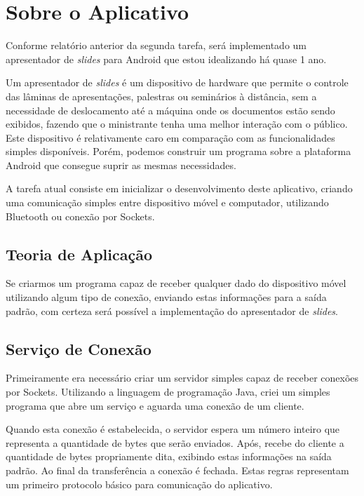 \documentclass{article}
\begin{document}
\section{Sobre o Aplicativo}
\label{sec:sobre}

Conforme relatório anterior da segunda tarefa, será implementado um apresentador
de \emph{slides} para Android que estou idealizando há quase 1 ano.

Um apresentador de \emph{slides} é um dispositivo de hardware que permite o
controle das lâminas de apresentações, palestras ou seminários à distância, sem
a necessidade de deslocamento até a máquina onde os documentos estão sendo
exibidos, fazendo que o ministrante tenha uma melhor interação com o público.
Este dispositivo é relativamente caro em comparação com as funcionalidades
simples disponíveis. Porém, podemos construir um programa sobre a plataforma
Android que consegue suprir as mesmas necessidades.

A tarefa atual consiste em inicializar o desenvolvimento deste aplicativo,
criando uma comunicação simples entre dispositivo móvel e computador, utilizando
Bluetooth ou conexão por Sockets.

\subsection{Teoria de Aplicação}

Se criarmos um programa capaz de receber qualquer dado do dispositivo móvel
utilizando algum tipo de conexão, enviando estas informações para a saída
padrão, com certeza será possível a implementação do apresentador de
\emph{slides}.

\subsection{Serviço de Conexão}

Primeiramente era necessário criar um servidor simples capaz de receber conexões
por Sockets. Utilizando a linguagem de programação Java, criei um simples
programa que abre um serviço e aguarda uma conexão de um cliente.

Quando esta conexão é estabelecida, o servidor espera um número inteiro que
representa a quantidade de bytes que serão enviados. Após, recebe do cliente a
quantidade de bytes propriamente dita, exibindo estas informações na saída
padrão. Ao final da transferência a conexão é fechada. Estas regras representam
um primeiro protocolo básico para comunicação do aplicativo.
\end{document}
